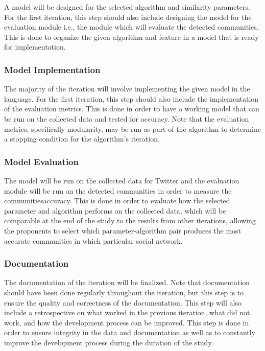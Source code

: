 A model will be designed for the selected algorithm and similarity parameters. For the first iteration, this step should also include designing the model for the evaluation module i.e., the module which will evaluate the detected communities. This is done to organize the given algorithm and feature in a model that is ready for implementation.




\subsubsection{Model Implementation}




The majority of the iteration will involve implementing the given model in the language. For the first iteration, this step should also include the implementation of the evaluation metrics. This is done in order to have a working model that can be run on the collected data and tested for accuracy. Note that the evaluation metrics, specifically modularity, may be run as part of the algorithm to determine a stopping condition for the algorithm’s iteration.




\subsubsection{Model Evaluation}




The model will be run on the collected data for Twitter and the evaluation module will be run on the detected communities in order to measure the communities\vtick accuracy. This is done in order to evaluate how the selected parameter and algorithm performs on the collected data, which will be comparable at the end of the study to the results from other iterations, allowing the proponents to select which parameter-algorithm pair produces the most accurate communities in which particular social network.




\subsubsection{Documentation}




The documentation of the iteration will be finalized. Note that documentation should have been done regularly throughout the iteration, but this step is to ensure the quality and correctness of the documentation. This step will also include a retrospective on what worked in the previous iteration, what did not work, and how the development process can be improved. This step is done in order to ensure integrity in the data and documentation as well as to constantly improve the development process during the duration of the study.




